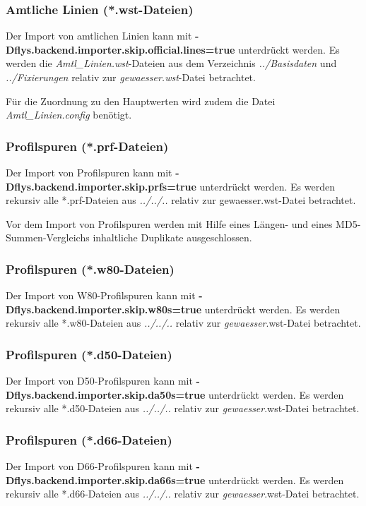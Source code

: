 \subsubsection{Amtliche Linien (*.wst-Dateien)}
Der Import von amtlichen Linien kann mit \textbf{-Dflys.backend.importer.skip.official.lines=true}
unterdrückt werden. Es werden die \textit{Amtl\_Linien.wst}-Dateien aus dem
Verzeichnis \textit{../Basisdaten} und \textit{../Fixierungen} relativ zur
\textit{gewaesser.wst}-Datei betrachtet.

Für die Zuordnung zu den Hauptwerten wird zudem die Datei
\textit{Amtl\_Linien.config} benötigt.

\subsubsection{Profilspuren (*.prf-Dateien)}
Der Import von Profilspuren kann mit \textbf{-Dflys.backend.importer.skip.prfs=true}
unterdrückt werden. Es werden rekursiv alle *.prf-Dateien aus \textit{../../..}
relativ zur gewaesser.wst-Datei betrachtet.

Vor dem Import von Profilspuren werden mit Hilfe
eines Längen- und eines MD5-Summen-Vergleichs inhaltliche Duplikate
ausgeschlossen.

\subsubsection{Profilspuren (*.w80-Dateien)}
Der Import von W80-Profilspuren kann mit \textbf{-Dflys.backend.importer.skip.w80s=true}
unterdrückt werden. Es werden rekursiv alle *.w80-Dateien aus \textit{../../..}
relativ zur \textit{gewaesser}.wst-Datei betrachtet.

\subsubsection{Profilspuren (*.d50-Dateien)}
Der Import von D50-Profilspuren kann mit \textbf{-Dflys.backend.importer.skip.da50s=true}
unterdrückt werden. Es werden rekursiv alle *.d50-Dateien aus \textit{../../..}
relativ zur \textit{gewaesser}.wst-Datei betrachtet.

\subsubsection{Profilspuren (*.d66-Dateien)}
Der Import von D66-Profilspuren kann mit \textbf{-Dflys.backend.importer.skip.da66s=true}
unterdrückt werden. Es werden rekursiv alle *.d66-Dateien aus \textit{../../..}
relativ zur \textit{gewaesser}.wst-Datei betrachtet.

